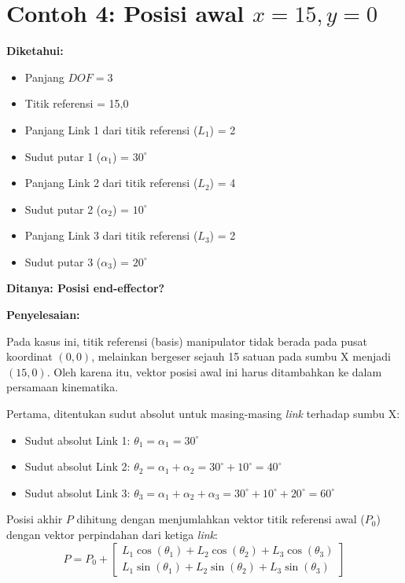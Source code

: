 \documentclass[12pt, a4paper, bahasa]{article}
\begin{document}
\section*{Contoh 4: Posisi  awal $x = 15, y=0$}
\textbf{Diketahui:}
\begin{itemize}
    \item Panjang $DOF = 3$
    \item Titik referensi = 15,0
    \item Panjang Link 1 dari titik referensi ($L_1$) = 2
    \item Sudut putar 1 ($\alpha_1$) = $30^\circ$
    \item Panjang Link 2 dari titik referensi ($L_2$) = 4
    \item Sudut putar 2 ($\alpha_2$) = $10^\circ$
    \item Panjang Link 3 dari titik referensi ($L_3$) = 2
    \item Sudut putar 3 ($\alpha_3$) = $20^\circ$
\end{itemize}

\noindent \textbf{Ditanya: Posisi end-effector?}
\vspace{0.5cm}

\noindent \textbf{Penyelesaian:}

Pada kasus ini, titik referensi (basis) manipulator tidak berada pada pusat koordinat $(0,0)$, melainkan bergeser sejauh 15 satuan pada sumbu X menjadi $(15,0)$. Oleh karena itu, vektor posisi awal ini harus ditambahkan ke dalam persamaan kinematika.

Pertama, ditentukan sudut absolut untuk masing-masing \textit{link} terhadap sumbu X:
\begin{itemize}
    \item Sudut absolut Link 1: $\theta_1 = \alpha_1 = 30^\circ$
    \item Sudut absolut Link 2: $\theta_2 = \alpha_1 + \alpha_2 = 30^\circ + 10^\circ = 40^\circ$
    \item Sudut absolut Link 3: $\theta_3 = \alpha_1 + \alpha_2 + \alpha_3 = 30^\circ + 10^\circ + 20^\circ = 60^\circ$
\end{itemize}

Posisi akhir $P$ dihitung dengan menjumlahkan vektor titik referensi awal ($P_0$) dengan vektor perpindahan dari ketiga \textit{link}:
\begin{equation}
P = P_0 + \begin{bmatrix} 
L_1 \cos(\theta_1) + L_2 \cos(\theta_2) + L_3 \cos(\theta_3) \\ 
L_1 \sin(\theta_1) + L_2 \sin(\theta_2) + L_3 \sin(\theta_3) 
\end{bmatrix}
\end{equation}
\end{document}

